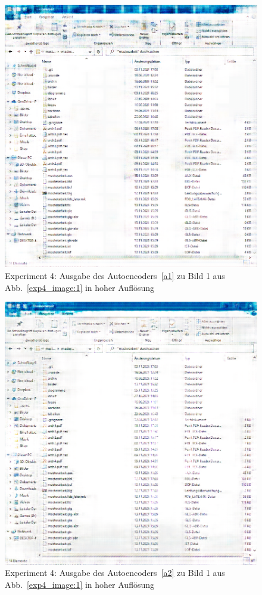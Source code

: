\begin{figure} [ht]
  \centering
  \includegraphics[width=\textwidth]{bilder/result_exp4/3_pred_a1.png}

  \caption{Experiment 4: Ausgabe des Autoencoders~\ref{a1} zu Bild 1 aus Abb.~\ref{exp4_image:1} in hoher Auflösung}
\end{figure}

\begin{figure} [ht]
  \centering
  \includegraphics[width=\textwidth]{bilder/result_exp4/3_pred_a2.png}

  \caption{Experiment 4: Ausgabe des Autoencoders~\ref{a2} zu Bild 1 aus Abb.~\ref{exp4_image:1} in hoher Auflösung}
\end{figure}

